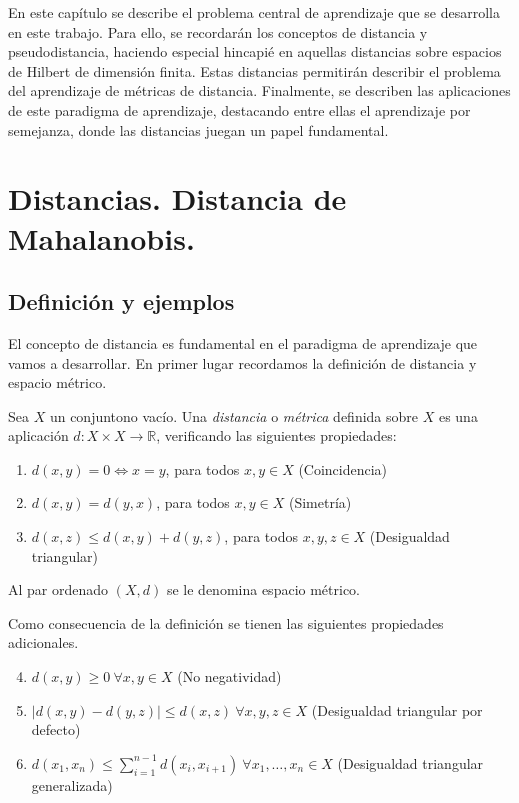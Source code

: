 \documentclass{book}
\begin{document}
En este capítulo se describe el problema central de aprendizaje que se desarrolla en este trabajo. Para ello, se recordarán los conceptos de distancia y pseudodistancia, haciendo especial hincapié en aquellas distancias sobre espacios de Hilbert de dimensión finita. Estas distancias permitirán describir el problema del aprendizaje de métricas de distancia. Finalmente, se describen las aplicaciones de este paradigma de aprendizaje, destacando entre ellas el aprendizaje por semejanza, donde las distancias juegan un papel fundamental.

\section{Distancias. Distancia de Mahalanobis.}

\subsection{Definición y ejemplos}

El concepto de distancia es fundamental en el paradigma de aprendizaje que vamos a desarrollar. En primer lugar recordamos la definición de distancia y espacio métrico.

\begin{definition}[Distancia]
	Sea $X$ un  conjuntono vacío. Una \emph{distancia} o \emph{métrica} definida sobre $X$ es una aplicación $d:X\times X \to \mathbb{R}$, verificando las siguientes propiedades:
	
	\begin{enumerate}
		\item $d(x,y)=0  \iff x = y $, para todos $x,y \in X$ (Coincidencia) \label{item:dist:coincid}
		\item $d(x,y)=d(y,x)$, para todos  $x,y \in X$ (Simetría)  \label{item:dist:sim}
		\item $d(x,z)\le d(x,y)+d(y,z)$, para todos $x,y,z \in X$ (Desigualdad triangular) \label{item:dist:triang}
	\end{enumerate}
	
	Al par ordenado $(X,d)$ se le denomina espacio métrico.
\end{definition}

\begin{remark}
	Como consecuencia de la definición se tienen las siguientes propiedades adicionales.
	\begin{enumerate}
		\setcounter{enumi}{3}
		\item $d(x,y) \ge 0 \ \forall x,y \in X$ (No negatividad) \label{item:dist:no_neg}
		\item $|d(x,y)-d(y,z)| \le d(x,z) \ \forall x,y,z \in X$ (Desigualdad triangular por defecto) \label{item:dist:triang_def}
		\item $d(x_1,x_n) \le \sum_{i=1}^{n-1}d(x_i,x_{i+1}) \ \forall x_1,\dots,x_n \in X$ (Desigualdad triangular generalizada) \label{item:dist:triang_gen}
	\end{enumerate}
\end{remark}
\end{document}
